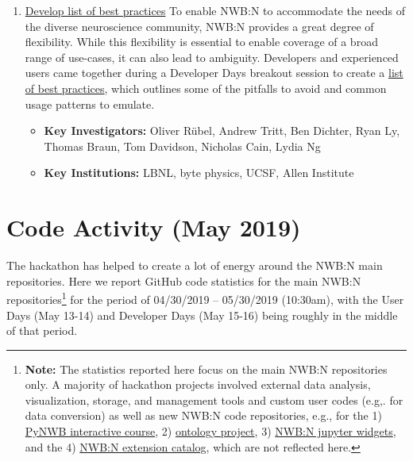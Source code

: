 \documentclass{article}
\begin{document}
\begin{enumerate}
    \item \href{https://neurodatawithoutborders.github.io/best_practices}{Develop list of best practices} To enable NWB:N to accommodate the needs of the diverse neuroscience community, NWB:N provides a great degree of flexibility. While this flexibility is essential to enable coverage of a broad range of use-cases, it can also lead to ambiguity. Developers and experienced users came together during a Developer Days breakout session to create a \href{https://neurodatawithoutborders.github.io/best_practices}{list of best practices}, which outlines some of the pitfalls to avoid and common usage patterns to emulate. 
        \vspace{-0.2cm}
        \begin{itemize}[noitemsep]
            \item \textbf{Key Investigators:} Oliver R\"ubel, Andrew Tritt, Ben Dichter, Ryan Ly, Thomas Braun, Tom Davidson, Nicholas Cain, Lydia Ng
            \item \textbf{Key Institutions:} LBNL, byte physics, UCSF, Allen Institute
        \end{itemize}
        
    \setcounter{projectEnumCounter}{\theenumi}
\end{enumerate}

\clearpage
\section{Code Activity (May 2019)}

The hackathon has helped to create a lot of energy around the NWB:N main repositories. Here we report GitHub 
code statistics for the main NWB:N repositories\footnote{\textbf{Note:} The statistics reported here focus on the main NWB:N repositories only. A majority of hackathon projects involved external data analysis, visualization, storage, and management tools and custom user codes (e.g,. for data conversion) as well as new NWB:N code repositories, e.g., for the 1) \href{https://github.com/NeurodataWithoutBorders/pynwb-course}{PyNWB interactive course}, 2) \href{https://github.com/NeurodataWithoutBorders/ontology-project}{ontology project}, 3) \href{https://github.com/NeurodataWithoutBorders/nwb-jupyter-widgets}{NWB:N jupyter widgets}, and the 4) \href{https://github.com/nwb-extensions}{NWB:N extension catalog},  which are not reflected here.} for the period of 04/30/2019 -- 05/30/2019 (10:30am), with the User Days (May 13-14) and Developer Days (May 15-16) being roughly in the middle of that period.
\end{document}
